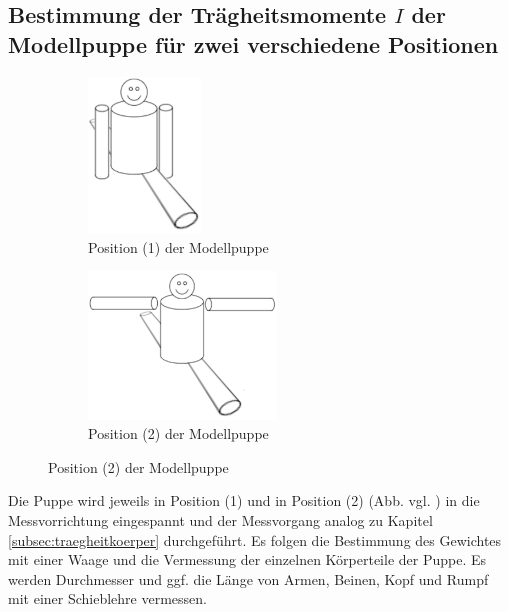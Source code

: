 \subsection{Bestimmung der Trägheitsmomente $I$ der Modellpuppe für zwei verschiedene Positionen}
\begin{figure}[h]
	\centering
	\label{fig:puppe}
	\begin{subfigure}{0.48\textwidth}
		\label{fig:puppe1}
		\centering
		\includegraphics[width=3cm]{Bilder/puppe1.pdf}
		\caption{Position (1) der Modellpuppe}
	\end{subfigure}
	\begin{subfigure}{0.48\textwidth}
		\label{fig:puppe2}
		\centering
		\includegraphics[width=5cm]{Bilder/puppe2.pdf}
		\caption{Position (2) der Modellpuppe}
	\end{subfigure}
\end{figure}
\noindent Die Puppe wird jeweils in Position (1) und in Position (2) (Abb. vgl. \cite{V101}) in die Messvorrichtung eingespannt und 
der Messvorgang analog zu Kapitel \ref{subsec:traegheitkoerper} durchgeführt. 
Es folgen die Bestimmung des Gewichtes mit einer Waage und die Vermessung der einzelnen Körperteile der Puppe. 
Es werden Durchmesser und ggf. die Länge von Armen, Beinen, Kopf und Rumpf mit einer Schieblehre vermessen.

